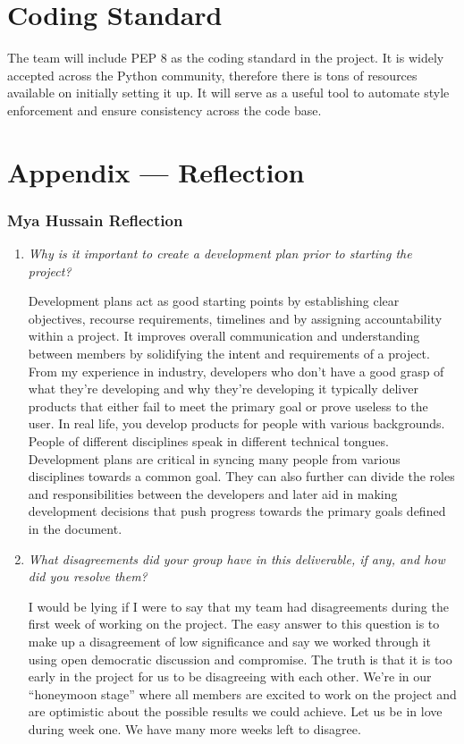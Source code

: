 \documentclass{article}
\begin{document}
\section{Coding Standard}

The team will include PEP 8 as the coding standard in the project. It is widely accepted across the Python community, therefore there is tons of resources available on initially setting it up. It will serve as a useful tool to automate style enforcement and ensure consistency across the code base.

\newpage{}

\section*{Appendix --- Reflection}



\subsubsection*{Mya Hussain Reflection}

\begin{enumerate}
  \item \textit{Why is it important to create a development plan prior to starting the project?}

    Development plans act as good starting points by establishing clear objectives, recourse requirements, timelines and by
    assigning accountability within a project. It improves overall communication and understanding between members by solidifying
    the intent and requirements of a project. From my experience in industry, developers who don’t have a good grasp of what they’re
    developing and why they’re developing it typically deliver products that either fail to meet the primary goal or prove useless to
    the user. In real life, you develop products for people with various backgrounds. People of different disciplines speak in different
    technical tongues. Development plans are critical in syncing many people from various disciplines towards a common goal. They can also
    further can divide the roles and responsibilities between the developers and later aid in making development decisions that push
    progress towards the primary goals defined in the document.

  \item \textit{What disagreements did your group have in this deliverable, if any, and how did you resolve them?}

    I would be lying if I were to say that my team had disagreements during the first week of working on the project. The easy answer to
    this question is to make up a disagreement of low significance and say we worked through it using open democratic discussion and
    compromise. The truth is that it is too early in the project for us to be disagreeing with each other. We’re in our “honeymoon stage”
    where all members are excited to work on the project and are optimistic about the possible results we could achieve. Let us be in love
    during week one. We have many more weeks left to disagree.

\end{enumerate}
\end{document}
